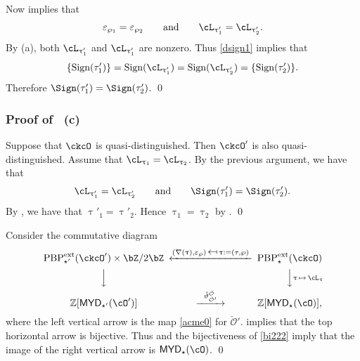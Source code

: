 \documentclass[11pt,a4paper]{amsart}
\def\MYD{{\mathsf{MYD}}}
\newcommand{\CO}{{\mathcal {O}}}
\newcommand{\Z}{\mathbb{Z}}
\newcommand{\be}{\begin {equation}}
\newcommand{\ee}{\end {equation}}
\numberwithin{equation}{section}
\theoremstyle{remark}
\def\PBPes{\mathrm{PBP}^{\mathrm{ext}}_{\star}}
\def\PBPesp{\mathrm{PBP}^{\mathrm{ext}}_{\star'}}
\def\MYD{{\mathsf{MYD}}}
\def\ac{\cL}
\begin{document}
Now   implies that 
\[
\varepsilon_{\wp_{1}}=\varepsilon_{\wp_{2}}\qquad \textrm{and}\qquad 
\ac_{\uptau'_{1}}=\ac_{\uptau'_{2}}.
\]
By  (a),  both $\ac_{\uptau'_{1}}$ and $\ac_{\uptau'_{1}}$
are nonzero. Thus   
 \eqref{dsign1} implies that
 \[
\{\sign{\tau_1'}\}= \sign{\ac_{\uptau'_{1}}}= \sign{\ac_{\uptau'_{2}}}=\{\sign{\tau_2'}\}.
 \] 
Therefore 
$\Sign(\tau'_{1})=\Sign(\tau'_{2})$. \qed

\subsubsection*{Proof of ~(c)}
 Suppose that $\ckcO$ is quasi-distinguished. Then $\ckcO'$ is also quasi-distinguished.  Assume 
that 
$
\ac_{\uptau_{1}}=\ac_{\uptau_{2}}$. By the previous argument, we have that 
\[
\ac_{\uptau'_{1}}=\ac_{\uptau'_{2}}\qquad \textrm{and}\qquad 
\Sign(\tau'_{1})=\Sign(\tau'_{2}).
\]
By , we have that  $\uptau'_{1}=\uptau'_{2}$. Hence $\uptau_{1}=\uptau_{2}$ by .  \qed

\newcommand\mapsfrom{\mathrel{\reflectbox{\ensuremath{\mapsto}}}}

Consider the commutative diagram
\be\label{cd00}
 \begin{CD}
 \PBPesp( \ckcO' )\times \bZ/2\bZ
                  @<  (\nabla(\uptau), \varepsilon_\wp)                   \,\mapsfrom\,
                  \uptau:=(\tau, \wp)
                  <<  \PBPes( \ckcO )\\
            @VV  V         @ VV  \uptau\,\mapsto\, \ac_\uptau V \\
    \Z[\MYD_{\star'}(\cO')]  @>  \check{\vartheta}_{\check \CO'}^{\check \CO}  >> \Z[\MYD_{\star}(\cO)],
  \end{CD}
\ee
where the left vertical arrow is the map \eqref{acme0} for $\check \CO'$.  implies that the top horizontal arrow is bijective. Thus   and   the bijectiveness of \eqref{bi222} imply that the image of the right vertical arrow is $\MYD_{\star}(\cO)$. \qed
\end{document}
